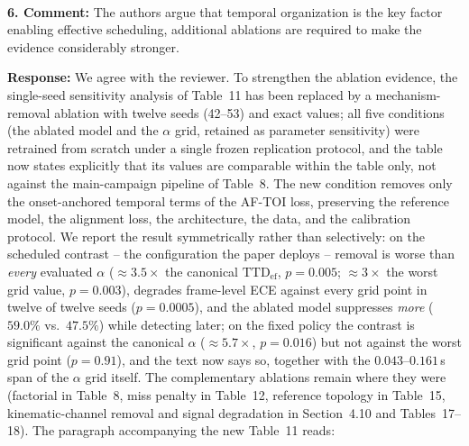 \documentclass[1p,12pt,authoryear]{elsarticle}
\begin{document}
~

\noindent \textbf{6. Comment:} The authors argue that temporal organization is the key factor enabling effective scheduling, additional ablations are required to make the evidence considerably stronger.

\vspace{2mm}
\noindent \textbf{Response:} We agree with the reviewer. To strengthen the ablation evidence, the single-seed sensitivity analysis of Table~11 has been replaced by a mechanism-removal ablation with twelve seeds (42--53) and exact values; all five conditions (the ablated model and the $\alpha$ grid, retained as parameter sensitivity) were retrained from scratch under a single frozen replication protocol, and the table now states explicitly that its values are comparable within the table only, not against the main-campaign pipeline of Table~8. The new condition removes only the onset-anchored temporal terms of the AF-TOI loss, preserving the reference model, the alignment loss, the architecture, the data, and the calibration protocol. We report the result symmetrically rather than selectively: on the scheduled contrast -- the configuration the paper deploys -- removal is worse than \emph{every} evaluated $\alpha$ (${\approx}3.5\times$ the canonical $\mathrm{TTD}_{\mathrm{ef}}$, $p=0.005$; ${\approx}3\times$ the worst grid value, $p=0.003$), degrades frame-level ECE against every grid point in twelve of twelve seeds ($p=0.0005$), and the ablated model suppresses \emph{more} ($59.0\%$ vs.\ $47.5\%$) while detecting later; on the fixed policy the contrast is significant against the canonical $\alpha$ (${\approx}5.7\times$, $p=0.016$) but not against the worst grid point ($p=0.91$), and the text now says so, together with the $0.043$--$0.161$\,s span of the $\alpha$ grid itself. The complementary ablations remain where they were (factorial in Table~8, miss penalty in Table~12, reference topology in Table~15, kinematic-channel removal and signal degradation in Section~4.10 and Tables~17--18). The paragraph accompanying the new Table~11 reads:

~
\end{document}
